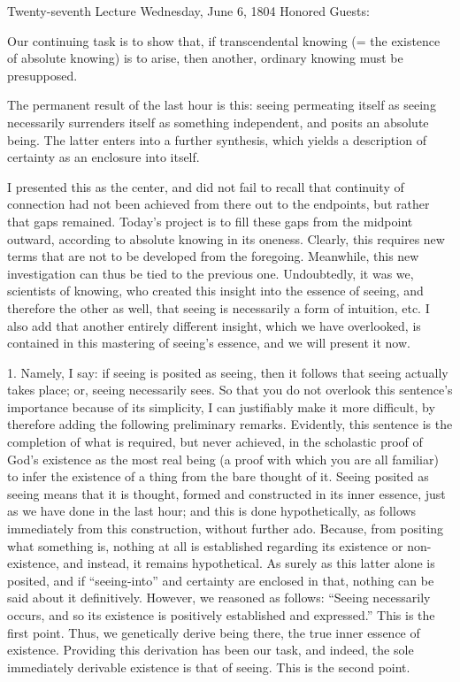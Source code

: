 Twenty-seventh Lecture
Wednesday, June 6, 1804
Honored Guests:

Our continuing task is to show that,
if transcendental knowing
(= the existence of absolute knowing)
is to arise, then another,
ordinary knowing must be presupposed.

The permanent result of the last hour is this:
seeing permeating itself as seeing
necessarily surrenders itself
as something independent,
and posits an absolute being.
The latter enters into a further synthesis,
which yields a description of certainty
as an enclosure into itself.

I presented this as the center,
and did not fail to recall
that continuity of connection
had not been achieved
from there out to the endpoints,
but rather that gaps remained.
Today's project is to fill these gaps
from the midpoint outward,
according to absolute knowing
in its oneness.
Clearly, this requires new terms
that are not to be developed from the foregoing.
Meanwhile, this new investigation can
thus be tied to the previous one.
Undoubtedly, it was we, scientists of knowing,
who created this insight into the essence of seeing,
and therefore the other as well,
that seeing is necessarily a form of intuition, etc.
I also add that another entirely different insight,
which we have overlooked, is contained in
this mastering of seeing's essence,
and we will present it now.

1. Namely, I say:
if seeing is posited as seeing,
then it follows that seeing actually takes place;
or, seeing necessarily sees.
So that you do not overlook this sentence's importance
because of its simplicity,
I can justifiably make it more difficult,
by therefore adding the following preliminary remarks.
Evidently, this sentence is the completion
of what is required, but never achieved,
in the scholastic proof of God's existence
as the most real being
(a proof with which you are all familiar)
to infer the existence of a thing
from the bare thought of it.
Seeing posited as seeing means that
it is thought, formed and constructed
in its inner essence,
just as we have done in the last hour;
and this is done hypothetically,
as follows immediately from this construction,
without further ado.
Because, from positing what something is,
nothing at all is established regarding
its existence or non-existence,
and instead, it remains hypothetical.
As surely as this latter alone is posited,
and if “seeing-into” and certainty are enclosed in that,
nothing can be said about it definitively.
However, we reasoned as follows:
“Seeing necessarily occurs,
and so its existence is
positively established and expressed.”
This is the first point.
Thus, we genetically derive being there,
the true inner essence of existence.
Providing this derivation has been our task,
and indeed, the sole immediately derivable
existence is that of seeing.
This is the second point.

